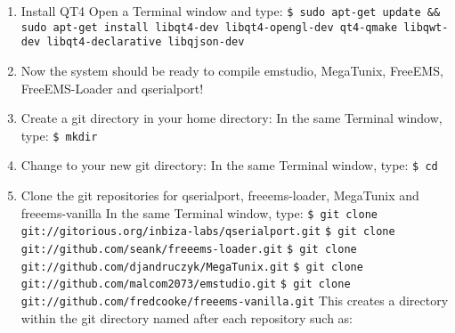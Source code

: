 \documentclass[12pt,notitlepage,onecolumn,oneside,openany]{memoir}
\begin{document}
\begin{enumerate}
\item \textsf{Install QT4} \newline
      \textsf{Open a Terminal window and type:} \newline
      \texttt{\$ sudo apt-get update \&\& sudo apt-get install libqt4-dev libqt4-opengl-dev qt4-qmake libqwt-dev libqt4-declarative libqjson-dev}

\item \textsf{Now the system should be ready to compile emstudio, MegaTunix, FreeEMS, FreeEMS-Loader and qserialport!}

\item \textsf{Create a git directory in your home directory:} \newline
      \textsf{In the same Terminal window, type:} \newline
      \texttt{\$ mkdir }

\item \textsf{Change to your new git directory:} \newline
      \textsf{In the same Terminal window, type:} \newline
      \texttt{\$ cd } 

\item \textsf{Clone the git repositories for qserialport, freeems-loader, MegaTunix and freeems-vanilla} \newline
      \textsf{In the same Terminal window, type:} \newline
      \texttt{\$ git clone git://gitorious.org/inbiza-labs/qserialport.git} \newline
      \texttt{\$ git clone git://github.com/seank/freeems-loader.git} \newline
      \texttt{\$ git clone git://github.com/djandruczyk/MegaTunix.git} \newline
      \texttt{\$ git clone git://github.com/malcom2073/emstudio.git} \newline
      \texttt{\$ git clone git://github.com/fredcooke/freeems-vanilla.git} \newline
      \newline
      \textsf{This creates a directory within the git directory named after each repository such as:} \newline
       \newline	
       \newline
       \newline
       \newline


\end{enumerate}
\end{document}
